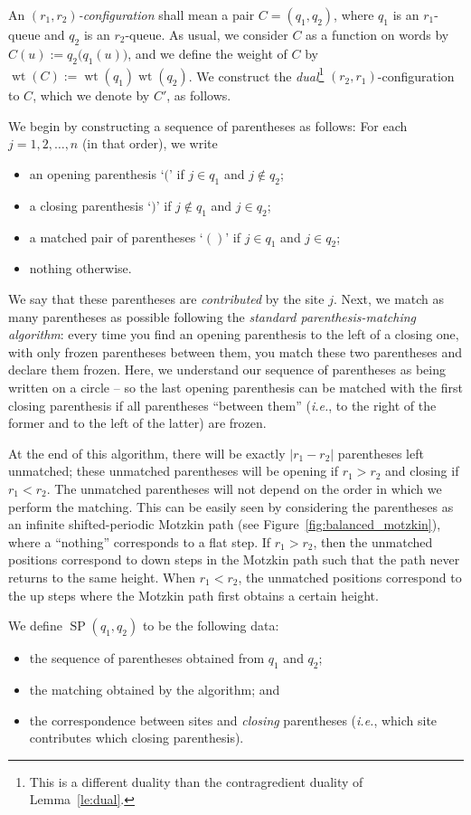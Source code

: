 \documentclass[reqno]{amsart}
\newcommand{\0}{\phantom{c}}
\DeclareMathOperator{\wt}{wt} %
\newcommand{\SP}{\operatorname{SP}}
\newcommand{\abs}[1]{\left| #1 \right|}
\newcommand{\defn}[1]{{\color{darkred}\emph{#1}}} %
\theoremstyle{plain}
\theoremstyle{definition}
\numberwithin{equation}{section}
\begin{document}
An \defn{$(r_1,r_2)$-configuration} shall mean a pair $C = (q_1, q_2)$, where $q_1$ is an $r_1$-queue and $q_2$ is an $r_2$-queue.
As usual, we consider $C$ as a function on words by $C(u) := q_2\bigr(q_1(u)\bigr)$, and we define the weight of $C$ by $\wt(C) := \wt(q_1) \wt(q_2)$.
We construct the \defn{dual}\footnote{This is a different duality than the contragredient duality of Lemma~\ref{le:dual}.} $(r_2,r_1)$-configuration to $C$, which we denote by $C'$, as follows.

We begin by constructing a sequence of parentheses as follows: For each $j = 1, 2, \dotsc, n$ (in that order), we write
\begin{itemize}
\item an opening parenthesis `$($' if $j \in q_1$ and $j \notin q_2$;
\item a closing parenthesis `$)$' if $j \notin q_1$ and $j \in q_2$;
\item a matched pair of parentheses `$()$' if $j \in q_1$ and $j \in q_2$;
\item nothing otherwise.
\end{itemize}
We say that these parentheses are \defn{contributed} by the site $j$.
Next, we match as many parentheses as possible following the \defn{standard parenthesis-matching algorithm}:
every time you find an opening parenthesis to the left of a closing one, with only frozen parentheses between them, you match these two parentheses and declare them frozen.
Here, we understand our sequence of parentheses as being written on a circle -- so the last opening parenthesis can be matched with the first closing parenthesis if all parentheses ``between them'' (\textit{i.e.}, to the right of the former and to the left of the latter) are frozen.

At the end of this algorithm, there will be exactly $\abs{r_1 - r_2}$ parentheses left unmatched; these unmatched parentheses will be opening if $r_1 > r_2$ and closing if $r_1 < r_2$. The unmatched parentheses will not depend on the order in which we perform the matching.
This can be easily seen by considering the parentheses as an infinite shifted-periodic Motzkin path (see Figure~\ref{fig:balanced_motzkin}), where a ``nothing'' corresponds to a flat step.
If $r_1 > r_2$, then the unmatched positions correspond to down steps in the Motzkin path such that the path never returns to the same height.
When $r_1 < r_2$, the unmatched positions correspond to the up steps where the Motzkin path first obtains a certain height.

We define \defn{$\SP(q_1, q_2)$} to be the following data:
\begin{itemize}
\item the sequence of parentheses obtained from $q_1$ and $q_2$;
\item the matching obtained by the algorithm; and
\item the correspondence between sites and \emph{closing} parentheses (\textit{i.e.}, which site contributes which closing parenthesis).
\end{itemize}
\end{document}
